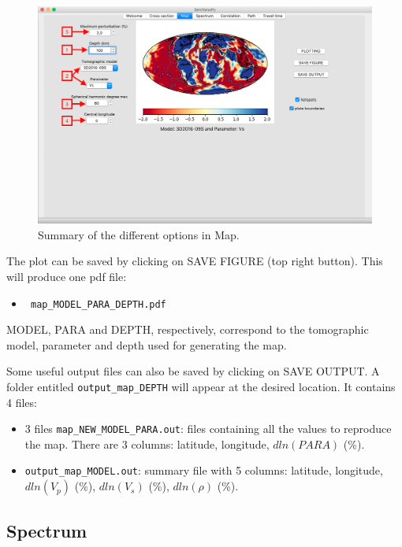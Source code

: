 \documentclass[12pt]{article}
\providecommand{\tightlist}{%
      \setlength{\itemsep}{0pt}\setlength{\parskip}{0pt}}
\begin{document}
\begin{figure}
\begin{center}
\includegraphics[scale=0.35]{SeisTomoPy_notebook/figures/mappy.png}
\caption{Summary of the different options in Map.}
\label{mappy}
\end{center}
\end{figure}

The plot can be saved by clicking on SAVE FIGURE (top right button).
This will produce one pdf file:

\begin{itemize}
\tightlist
\item
 \verb? map_MODEL_PARA_DEPTH.pdf?
\end{itemize}
MODEL, PARA and DEPTH, respectively, correspond  to the tomographic model,
 parameter and  depth used for generating the map.

Some useful output files can also be saved by clicking on SAVE OUTPUT. A
folder entitled \verb?output_map_DEPTH? will appear at the desired
location. It contains 4 files:

\begin{itemize}
\item
  3 files \verb?map_NEW_MODEL_PARA.out?: files containing all the values to
  reproduce the map. There are 3 columns: latitude, longitude,
  \(dln(PARA)\) (\%).
\item
  \verb?output_map_MODEL.out?: summary file with 5 columns: latitude,
  longitude, \(dln(V_p)\) (\%), \(dln(V_s)\) (\%), \(dln(\rho)\) (\%).
\end{itemize}

\subsection{Spectrum}\label{specpy}
\end{document}
